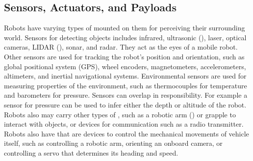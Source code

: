 \subsection{Sensors, Actuators, and Payloads}
Robots have varying types of  mounted on them for perceiving their surrounding world. Sensors for detecting objects includes infrared, ultrasonic (), laser, optical cameras, LIDAR (), sonar, and radar. They act as the eyes of a mobile robot. Other sensors are used for tracking the robot's position and orientation, such as global positional system (GPS), wheel encoders, magnetometers, accelerometers, altimeters, and inertial navigational systems. Environmental sensors are used for measuring properties of the environment, such as thermocouples for temperature and barometers for pressure. Sensors can overlap in responsibility. For example a sensor for pressure can be used to infer either the depth or altitude of the robot. Robots also may carry other types of , such as a robotic arm () or grapple to interact with objects, or devices for communication such as a radio transmitter. Robots also have  that are devices to control the mechanical movements of vehicle itself, such as controlling a robotic arm, orienting an onboard camera, or controlling a servo that determines its heading and speed.




